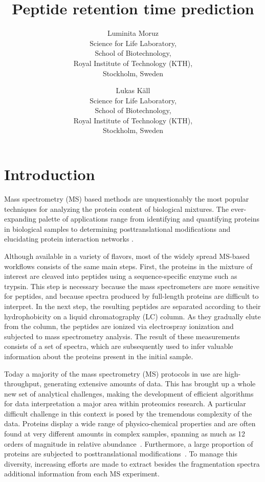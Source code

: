 \documentclass[a4paper]{article}
\title{Peptide retention time prediction}
\author{
Luminita Moruz\\
Science for Life Laboratory,\\
School of Biotechnology,\\
Royal Institute of Technology (KTH),\\
Stockholm, Sweden
\and
Lukas K\"{a}ll\\
Science for Life Laboratory,\\
School of Biotechnology,\\
Royal Institute of Technology (KTH),\\
Stockholm, Sweden}
\begin{document}
\maketitle

\setcounter{secnumdepth}{2} %
\setcounter{tocdepth}{2}    %
\tableofcontents            %

\setlength{\parskip}{0.15cm}

\section{Introduction}

Mass spectrometry (MS) based methods are unquestionably the most
popular techniques for analyzing the protein content of biological
mixtures.  The ever-expanding palette of applications range from
identifying and quantifying proteins in biological samples
\cite{Geiger2012} to determining posttranslational modifications
\cite{Huttlin2010} and elucidating protein interaction networks
\cite{Gavin2011}.


Although available in a variety of flavors, most of the widely spread
MS-based workflows consists of the same main steps. First, the
proteins in the mixture of interest are cleaved into peptides using a
sequence-specific enzyme such as trypsin. This step is necessary
because the mass spectrometers are more sensitive for peptides, and
because spectra produced by full-length proteins are difficult to
interpret. In the next step, the resulting peptides are separated
according to their hydrophobicity on a liquid chromatography (LC)
column. As they gradually elute from the column, the peptides are
ionized via electrospray ionization and subjected to mass spectrometry
analysis. The result of these measurements consists of a set of
spectra, which are subsequently used to infer valuable information
about the proteins present in the initial sample.


Today a majority of the mass spectrometry (MS) protocols in use are
high-throughput, generating extensive amounts of data. This has
brought up a whole new set of analytical challenges, making the
development of efficient algorithms for data interpretation a major
area within proteomics research. A particular difficult challenge in
this context is posed by the tremendous complexity of the data.
Proteins display a wide range of physico-chemical properties and are
often found at very different amounts in complex samples, spanning as
much as 12 orders of magnitude in relative abundance~\cite{Angel2012}.
Furthermore, a large proportion of proteins are subjected to
posttranslational modifications~\cite{Lemeer2009}. To manage this
diversity, increasing efforts are made to extract besides the
fragmentation spectra additional information from each MS experiment.
\end{document}
